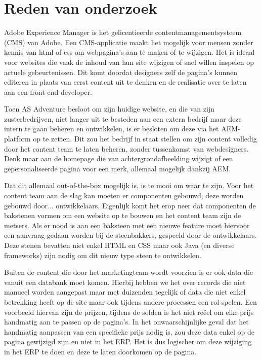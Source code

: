 \documentclass{article}
\begin{document}
	\section{Reden van onderzoek}
	Adobe Experience Manager is het gelicentieerde  contentmanagementsysteem (CMS) van Adobe. 
	Een CMS-applicatie maakt het mogelijk voor mensen zonder kennis van html of css om webpagina’s aan te maken of te wijzigen. 
	Het is ideaal voor websites die vaak de inhoud van hun site wijzigen of snel willen inspelen op actuele gebeurtenissen. 
	Dit komt doordat designers zelf de pagina’s kunnen editeren in plaats van eerst content uit te denken en de realisatie over te laten aan een front-end developer. 
	\par
	Toen AS Adventure besloot om zijn huidige website, en die van zijn zusterbedrijven, niet langer uit te besteden aan een extern bedrijf maar deze intern te gaan beheren en ontwikkelen, is er besloten om deze via het AEM-platform op te zetten. 
	Dit zou het bedrijf in staat stellen om zijn content volledig door het content team te laten beheren, zonder tussenkomst van webdesigners.
	Denk maar aan de homepage die van achtergrondafbeelding wijzigt of een gepersonaliseerde pagina voor een merk, allemaal mogelijk dankzij AEM.
	\par
	Dat dit allemaal out-of-the-box mogelijk is, is te mooi om waar te zijn. Voor het content team aan de slag kan moeten er componenten gebouwd, deze worden gebouwd door... ontwikkelaars. Eigenlijk komt het erop neer dat componenten de bakstenen vormen om een website op te bouwen en het content team zijn de metsers. Als er nood is aan een baksteen met een nieuwe feature moet hiervoor een aanvraag gedaan worden bij de steenbakkers, gespeeld door de ontwikkelaars. Deze stenen bevatten niet enkel HTML en CSS maar ook Java (en diverse frameworks) zijn nodig om dit nieuw type steen te ontwikkelen.
	\par
	Buiten de content die door het marketingteam wordt voorzien is er ook data die vanuit een databank moet komen. 
	Hierbij hebben we het over records die niet manueel worden aangepast maar met duizenden tegelijk of data die niet enkel betrekking heeft op de site maar ook tijdens andere processen een rol spelen. 
	Een voorbeeld hiervan zijn de prijzen, tijdens de solden is het niet reëel om elke prijs handmatig aan te passen op de pagina’s. 
	In het onwaarschijnlijke geval dat het handmatig aanpassen van een specifieke prijs nodig is, zou deze data enkel op de pagina gewijzigd zijn en niet in het ERP. 
	Het is dus logischer om deze wijziging in het ERP te doen en deze te laten doorkomen op de pagina. 
\end{document}
